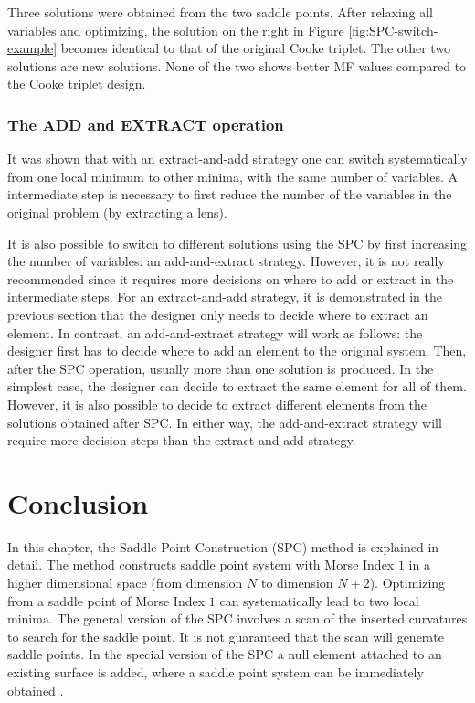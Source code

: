 Three solutions were obtained from the two saddle points. After relaxing all variables and optimizing, the solution on the right in Figure \ref{fig:SPC-switch-example} becomes identical to that of the original Cooke triplet. The other two solutions are new solutions. None of the two shows better MF values compared to the Cooke triplet design. 


\subsubsection{The ADD and EXTRACT operation }
It was shown that with an extract-and-add strategy one can switch systematically from one local minimum to other minima, with the same number of variables. A intermediate step is necessary to first reduce the number of the variables in the original problem (by extracting a lens). 

It is also possible to switch to different solutions using the SPC by first increasing the number of variables: an add-and-extract strategy. However, it is not really recommended since it requires more decisions on where to add or extract in the intermediate steps. For an extract-and-add strategy, it is demonstrated in the previous section that the designer only needs to decide where to extract an element. In contrast, an add-and-extract strategy will work as follows: the designer first has to decide where to add an element to the original system. Then, after the SPC operation, usually more than one solution is produced. In the simplest case, the designer can decide to extract the same element for all of them. However, it is also possible to decide to extract different elements from the solutions obtained after SPC. In either way, the add-and-extract strategy will require more decision steps than the extract-and-add strategy.

\section{Conclusion}
In this chapter, the Saddle Point Construction (SPC) method is explained in detail. The method constructs saddle point system with Morse Index $1$ in a higher dimensional space (from dimension $N$ to dimension $N+2$). Optimizing from a saddle point of Morse Index $1$ can systematically lead to two local minima. The general version of the SPC involves a scan of the inserted curvatures to search for the saddle point. It is not guaranteed that the scan will generate saddle points. In the special version of the SPC a null element attached to an existing surface is added, where a saddle point system can be immediately obtained \cite{BociortSPCSexplained}. 


